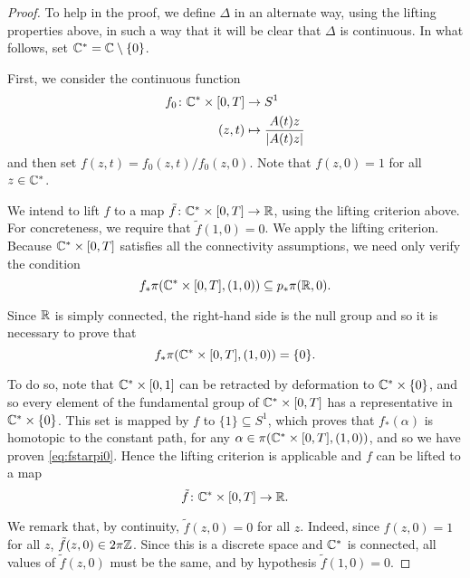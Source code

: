\begin{proof}
To help in the proof, we define $\Delta$ in an alternate way, using the lifting properties above, in such a way that it will be clear that $\Delta$ is continuous. In what follows, set $\mathbb{C}^* = \mathbb{C} \setminus \{0\}$.

First, we consider the continuous function
\begin{equation}
\begin{aligned}
f_0 \colon \C^* \times \interval0T &\to S^1\\
(z,t) &\mapsto \frac{A(t) z}{\abs{A(t) z}}
\end{aligned}
\end{equation}
and then set $f(z,t) = f_0(z,t) / f_0(z,0)$. Note that $f(z,0) = 1$ for all $z \in \mathbb{C}^*$.

We intend to lift $f$ to a map $\tilde f \colon \C^* \times \interval0T \to \R$, using the lifting criterion above. For concreteness, we require that $\tilde f(1,0) = 0$. We apply the lifting criterion. Because $\C^* \times \interval0T$ satisfies all the connectivity assumptions, we need only verify the condition
\begin{equation}
f_* \pi(\C^* \times \interval0T, (1,0)) \subseteq p_* \pi(\R,0).
\end{equation}

Since $\mathbb{R}$ is simply connected, the right-hand side is the null group and so it is necessary to prove that
\begin{equation}\label{eq:fstarpi0}
f_* \pi(\C^* \times \interval0T, (1,0)) = \{0\}. 
\end{equation}

To do so, note that $\C^* \times \interval01$ can be retracted by deformation to $\mathbb{C}^* \times \{0\}$, and so every element of the fundamental group of $\C^* \times \interval0T$ has a representative in $\mathbb{C}^* \times \{0\}$. This set is mapped by $f$ to $\{1\} \subseteq S^1$, which proves that $f_*(\alpha)$ is homotopic to the constant path, for any $\alpha \in \pi(\C^* \times \interval0T,(1,0))$, and so we have proven \eqref{eq:fstarpi0}. Hence the lifting criterion is applicable and $f$ can be lifted to a map
\begin{equation}
\tilde f \colon \C^* \times \interval0T \to \R.
\end{equation}

We remark that, by continuity, $\tilde f(z,0) = 0$ for all $z$. Indeed, since $f(z,0) = 1$ for all $z$, $\tilde f(z,0) \in 2 \pi \mathbb{Z}$. Since this is a discrete space and $\mathbb{C}^*$ is connected, all values of $\tilde f(z,0)$ must be the same, and by hypothesis $\tilde f(1,0) = 0$.


\end{proof}
